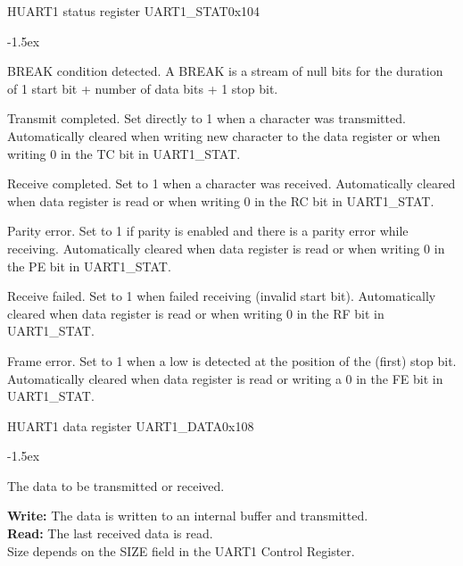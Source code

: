 \documentclass[12pt]{article}
\begin{document}
\begin{register}{H}{UART1 status register UART1\_STAT}{0x104}
\label{uart1stat}
%
%
%
%
%
%
\regnewline%
\end{register}
\begin{regdesc}[0.8\textwidth]\begin{reglist}[0000]
\itemsep-1.5ex
\item[BR] BREAK condition detected. A BREAK is a stream of null bits for the duration of 1 start bit + number of data bits + 1 stop bit.
\item[TC] Transmit completed. Set directly to 1 when a character was transmitted. Automatically cleared when writing new character to the data register or when writing 0 in the TC bit in \mbox{UART1\_STAT}.
\item[RC] Receive completed. Set to 1 when a character was received. Automatically cleared when data register is read or when writing 0 in the RC bit in UART1\_STAT.
\item[PE] Parity error. Set to 1 if parity is enabled and there is a parity error while receiving. Automatically cleared when data register is read or when writing 0 in the PE bit in UART1\_STAT.
\item[RF] Receive failed. Set to 1 when failed receiving (invalid start bit). Automatically cleared when data register is read or when writing 0 in the RF bit in UART1\_STAT.
\item [FE] Frame error. Set to 1 when a low is detected at the position of the (first) stop bit. Automatically cleared when data register is read or writing a 0 in the FE bit in UART1\_STAT.
\end{reglist}\end{regdesc}

\begin{register}{H}{UART1 data register UART1\_DATA}{0x108}
\label{uart1data}
%
\regnewline%
\end{register}
\begin{regdesc}[0.6\textwidth]\begin{reglist}[000000000]
\itemsep-1.5ex
\item[DATA] The data to be transmitted or received.
\end{reglist}\end{regdesc}
\textbf{Write:} The data is written to an internal buffer and transmitted.\\
\textbf{Read:} The last received data is read. \\
Size depends on the SIZE field in the UART1 Control Register.
\end{document}

